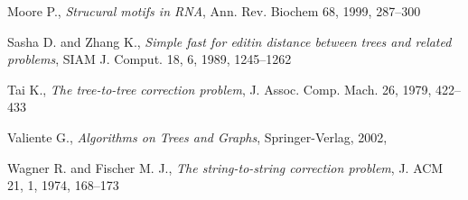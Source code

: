 \begin{thebibliography}{99}
  Moore P.,
  \textit{Strucural motifs in RNA},
  Ann. Rev. Biochem 68,
  1999,
  287--300
  
  Sasha D. and Zhang K.,
  \textit{Simple fast for editin distance between trees and related problems},
  SIAM J. Comput. 18, 6,
  1989,
  1245--1262
  
  Tai K.,
  \textit{The tree-to-tree correction problem},
  J. Assoc. Comp. Mach. 26,
  1979,
  422--433
  
  Valiente G.,
  \textit{Algorithms on Trees and Graphs},
  Springer-Verlag,
  2002,
  
  Wagner R. and Fischer M. J.,
  \textit{The string-to-string correction problem},
  J. ACM 21, 1,
  1974,
  168--173
  
\end{thebibliography}